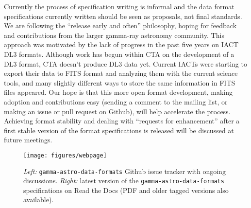 Currently the process of specification writing is informal and the data format specifications currently written should be seen as proposals, not final standards. We are following the ``release early and often'' philosophy, hoping for feedback and contributions from the larger gamma-ray astronomy community. This approach was motivated by the lack of progress in the past five years on IACT DL3 formats.  Although work has begun within CTA on the development of a DL3 format, CTA doesn't produce DL3 data yet.  Current IACTs were starting to export their data to FITS format and analyzing them with the current science tools, and many slightly different ways to store the same information in FITS files appeared.  Our hope is that this more open format development, making adoption and contributions easy (sending a comment to the mailing list, or making an issue or pull request on Github), will help accelerate the process.  Achieving format stability and dealing with ``requests for enhancement'' after a first stable version of the format specifications is released will be discussed at future meetings.

\begin{figure}[tb]
\centerline{\texttt{[image: figures/webpage]}}
\caption{
\emph{Left:} \texttt{gamma-astro-data-formats} Github issue tracker with ongoing discussions. \emph{Right:} latest version of the \texttt{gamma-astro-data-formats} specifications on Read the Docs (PDF and older tagged versions also available).
}
\label{fig:webpage}
\end{figure}
